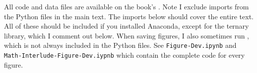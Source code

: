 
\noindent All code and data files are available on the book's . Note I exclude imports from the Python files in the main text. The imports below should cover the entire text. All of these should be included if you installed Anaconda, except for the ternary library, which I comment out below. When saving figures, I also sometimes run , which is not always included in the Python files. See \texttt{Figure-Dev.ipynb} and \texttt{Math-Interlude-Figure-Dev.iypnb} which contain the complete code for every figure.


